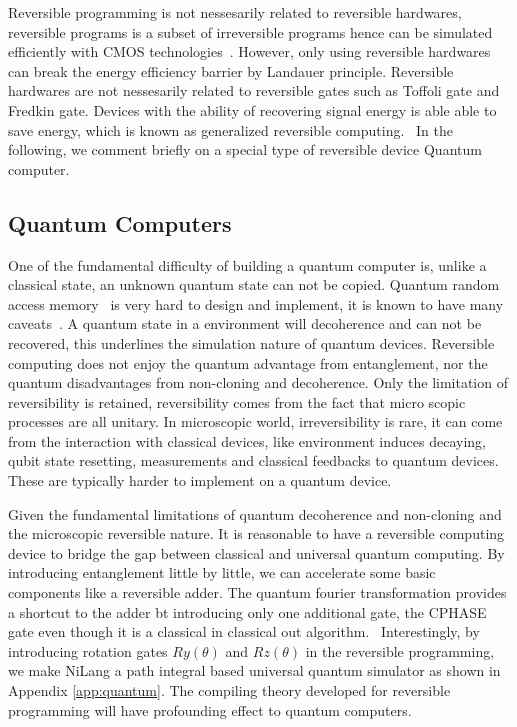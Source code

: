 \documentclass[aps,twocolumn,longbibliography,english,superscriptaddress,prr]{revtex4-1}
\newcommand{\<}{\langle}
\renewcommand{\>}{\rangle}
\newcommand{\App}[1]{Appendix \ref{#1}}
\theoremstyle{definition}\newtheorem{definition}{\textit{Definition}}
\begin{document}
Reversible programming is not nessesarily related to reversible hardwares, reversible programs is a subset of irreversible programs hence can be simulated efficiently with CMOS technologies~\cite{Vieri1999}. However, only using reversible hardwares~\cite{} can break the energy efficiency barrier by Landauer principle.
Reversible hardwares are not nessesarily related to reversible gates such as Toffoli gate and Fredkin gate.
Devices with the ability of recovering signal energy is able able to save energy, which is known as generalized reversible computing.~\cite{Frank2005,Frank2017b}
In the following, we comment briefly on a special type of reversible device Quantum computer.

\subsection{Quantum Computers}\label{sec:qc}
One of the fundamental difficulty of building a quantum computer is, unlike a classical state, an unknown quantum state can not be copied.
Quantum random access memory~\cite{} is very hard to design and implement, it is known to have many caveats~\cite{Scott}.
A quantum state in a environment will decoherence and can not be recovered, this underlines the simulation nature of quantum devices.
Reversible computing does not enjoy the quantum advantage from entanglement, nor the quantum disadvantages from non-cloning and decoherence.
Only the limitation of reversibility is retained, reversibility comes from the fact that micro scopic processes are all unitary.
In microscopic world, irreversibility is rare, it can come from the interaction with classical devices, like environment induces decaying, qubit state resetting, measurements and classical feedbacks to quantum devices. These are typically harder to implement on a quantum device.

Given the fundamental limitations of quantum decoherence and non-cloning and the microscopic reversible nature.
It is reasonable to have a reversible computing device to bridge the gap between classical and universal quantum computing.
By introducing entanglement little by little, we can accelerate some basic components like a reversible adder.
The quantum fourier transformation provides a shortcut to the adder bt introducing only one additional gate, the CPHASE gate even though it is a classical in classical out algorithm.~\cite{} Interestingly, by introducing rotation gates $Ry(\theta)$ and $Rz(\theta)$ in the reversible programming, we make NiLang a path integral based universal quantum simulator as shown in \App{app:quantum}. The compiling theory developed for reversible programming will have profounding effect to quantum computers.
\end{document}
